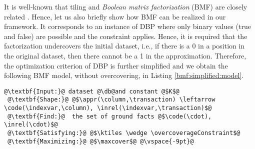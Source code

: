 
It is well-known that tiling and {\em Boolean matrix factorization} (BMF) are closely related \citep{conf/icdm/Miettinen12}. Hence, let us also briefly show how BMF can be realized in our framework.  It corresponds to an instance of DBP where only binary values (true and false) are possible and the \overcoverageConstraint constraint applies. Hence, it is required that the factorization undercovers the initial dataset, i.e., if there is a 0 in a position in the original dataset, then there cannot be a 1 in the approximation.  Therefore, the optimization criterion of DBP is further simplified and we obtain the following BMF model, without overcovering, in Listing \ref{bmf:simplified:model}.
\begin{lstlisting}[style=model, label=bmf:simplified:model, caption=BMF without overcovering]
 @\textbf{Input:}@ dataset @\db@and constant @$K$@
 @\textbf{Shape:}@ @$\appr(\column,\transaction) \leftarrow \code(\indexvar,\column), \inrel(\indexvar,\transaction)$@
 @\textbf{Find:}@  the set of ground facts @$\code(\cdot), \inrel(\cdot)$@
 @\textbf{Satisfying:}@ @$\ktiles \wedge \overcoverageConstraint$@
 @\textbf{Maximizing:}@ @$\maxcover$@ @\vspace{-9pt}@
 \end{lstlisting}


